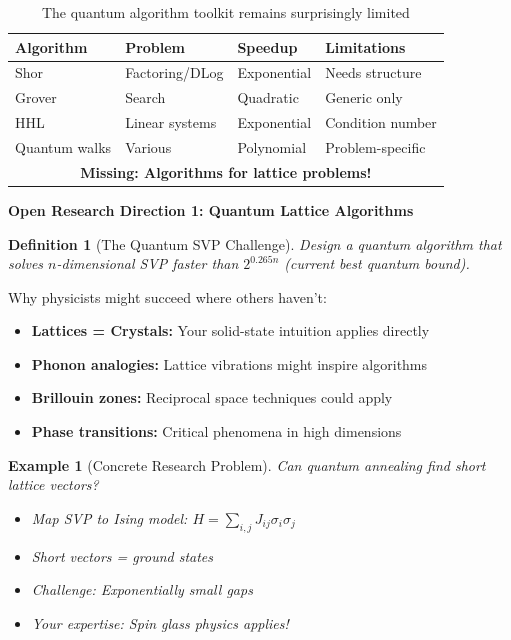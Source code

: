 \documentclass[11pt,a4paper]{article}
\newtheorem{definition}{Definition}
\newtheorem{example}{Example}
\begin{document}
\begin{table}[h]
\centering
\begin{tabular}{|l|l|l|l|}
\hline
\textbf{Algorithm} & \textbf{Problem} & \textbf{Speedup} & \textbf{Limitations} \\
\hline
Shor & Factoring/DLog & Exponential & Needs structure \\
Grover & Search & Quadratic & Generic only \\
HHL & Linear systems & Exponential & Condition number \\
Quantum walks & Various & Polynomial & Problem-specific \\
\hline
\multicolumn{4}{|c|}{\textbf{Missing: Algorithms for lattice problems!}} \\
\hline
\end{tabular}
\caption{The quantum algorithm toolkit remains surprisingly limited}
\end{table}

\textbf{Open Research Direction 1: Quantum Lattice Algorithms}

\begin{definition}[The Quantum SVP Challenge]
Design a quantum algorithm that solves $n$-dimensional SVP faster than $2^{0.265n}$ (current best quantum bound).
\end{definition}

Why physicists might succeed where others haven't:
\begin{itemize}
    \item \textbf{Lattices = Crystals:} Your solid-state intuition applies directly
    \item \textbf{Phonon analogies:} Lattice vibrations might inspire algorithms
    \item \textbf{Brillouin zones:} Reciprocal space techniques could apply
    \item \textbf{Phase transitions:} Critical phenomena in high dimensions
\end{itemize}

\begin{example}[Concrete Research Problem]
Can quantum annealing find short lattice vectors?
\begin{itemize}
    \item Map SVP to Ising model: $H = \sum_{i,j} J_{ij} \sigma_i \sigma_j$
    \item Short vectors = ground states
    \item Challenge: Exponentially small gaps
    \item Your expertise: Spin glass physics applies!
\end{itemize}
\end{example}
\end{document}
